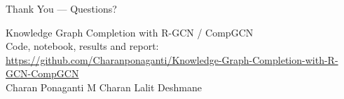 \documentclass[aspectratio=43,11pt]{beamer}
\begin{document}
\begin{frame}{Thank You --- Questions?}
  \begin{center}
    {\Large Knowledge Graph Completion with R-GCN / CompGCN}\\[1.2em]
    Code, notebook, results and report:\\[0.4em]
    {\small\url{https://github.com/Charanponaganti/Knowledge-Graph-Completion-with-R-GCN-CompGCN}}\\[1.5em]
    Charan Ponaganti \quad M Charan \quad Lalit Deshmane
  \end{center}
\end{frame}
\end{document}
